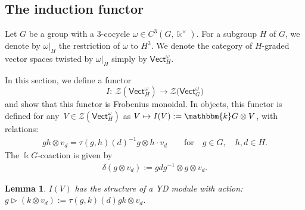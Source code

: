 \documentclass[10pt,a4paper]{amsart}
\numberwithin{equation}{section}
\newtheorem{Lemma}[Theorem]{Lemma}
\newcommand{\Vect}{\mathsf{Vect}}
\newcommand{\cZ}{\mathcal{Z}}
\newcommand{\rI}{I}
\begin{document}
\subsection{The induction functor}\label{sec:I}
Let $G$ be a group with a $3$-cocycle $\omega\in C^3(G,\Bbbk^\times)$. For a subgroup $H$ of $G$, we denote by $\omega|_H$ the restriction of $\omega$ to $H^3$. We denote the category of $H$-graded vector spaces twisted by $\omega|_H$ simply by $\Vect_H^\omega$.

In this section, we define a functor
\[\rI \colon\ \cZ( \Vect_H^\omega) \to \cZ\big(\Vect_G^\omega\big)\]
and show that this functor is Frobenius monoidal.
In objects, this functor is defined for any~$V \in \cZ( \Vect_H^\omega)$ as $V \mapsto \rI (V):=\mathbbm{k}G \otimes V$, with relations:
\begin{align}\label{eq:relationsIV}
gh \otimes v_d =\tau(g,h)(d)^{-1} g \otimes h \cdot v_d \qquad \text{for}\quad g \in G, \quad h,d \in H.
\end{align}
The $\Bbbk G$-coaction is given by
\begin{gather*}
\delta ( g \otimes v_d ) := gdg^{-1} \otimes g \otimes v_d.
\end{gather*}

\begin{Lemma}\label{lem:IV-twistedYD}
$\rI ( V )$ has the structure of a YD module with action: ${g\! \vartriangleright\! ( k \otimes v_d ):=\tau(g,k)(d) gk\! \otimes\! v_d}$.
\end{Lemma}
\end{document}
